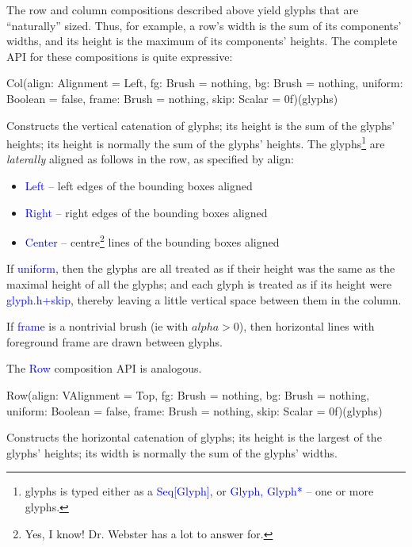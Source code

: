 \documentclass[12pt,a4paper]{article}
\def\Scala#1{\textcolor{blue}{\textsf{#1}}}
\begin{document}
The row and column compositions described above yield glyphs that
are ``naturally'' sized. Thus, for example, a row's width is the
sum of its components' widths, and its height is the maximum of its
components' heights. The complete API for these compositions is quite
expressive:
\begin{scala}
   Col(align:   Alignment = Left,
       fg:      Brush     = nothing,
       bg:      Brush     = nothing,
       uniform: Boolean   = false,
       frame:   Brush     = nothing,
       skip:    Scalar    = 0f)(glyphs)
\end{scala}
Constructs the vertical catenation of glyphs; its height is the sum of the
glyphs' heights; its height is normally the sum of the glyphs' heights.
The glyphs\footnote{glyphs is typed either as a \Scala{Seq[Glyph]}, or
\Scala{Glyph, Glyph*} -- one or more
glyphs.} are \textit{laterally} aligned as follows in the row, as specified
by align:

\begin{itemize}
\item \Scala{Left}   --   left edges of the bounding boxes aligned
\item \Scala{Right}  --   right edges of the bounding boxes aligned
\item \Scala{Center}  --  centre\footnote{Yes, I know!
Dr. Webster has a lot to answer for.} lines of the bounding boxes aligned
\end{itemize}

If \Scala{uniform}, then the glyphs are all treated as if their
height was the same as the maximal height of all the glyphs; and
each glyph is treated as if its height were \Scala{glyph.h+skip}, thereby
leaving a little vertical space between them in the column.

If \Scala{frame} is a nontrivial brush (ie with $alpha>0$), then horizontal lines
with foreground frame are drawn between glyphs.

The \Scala{Row} composition API is analogous.
\begin{scala}
   Row(align:   VAlignment = Top,
       fg:      Brush      = nothing,
       bg:      Brush      = nothing,
       uniform: Boolean    = false,
       frame:   Brush      = nothing,
       skip:    Scalar     = 0f)(glyphs)
\end{scala}

Constructs the horizontal catenation of glyphs; its height is the
largest of the glyphs' heights; its width is normally the sum of
the glyphs' widths.
\end{document}
